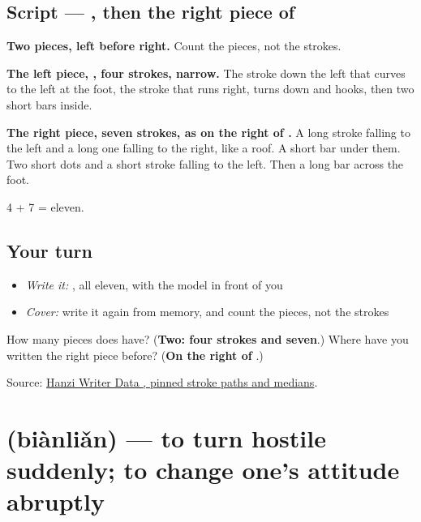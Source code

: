 \subsection*{Script — , then the right piece of }

\begin{quote}
\end{quote}

\textbf{Two pieces, left before right.} Count the pieces, not the strokes.

\textbf{The left piece, , four strokes, narrow.} The stroke down the left that curves to the left at the foot, the stroke that runs right, turns down and hooks, then two short bars inside.

\textbf{The right piece, seven strokes, as on the right of .} A long stroke falling to the left and a long one falling to the right, like a roof. A short bar under them. Two short dots and a short stroke falling to the left. Then a long bar across the foot.

4 + 7 = eleven.

\subsection*{Your turn}
\begin{itemize}
\raggedright
  \item \emph{Write it:} , all eleven, with the model in front of you
  \item \emph{Cover:} write it again from memory, and count the pieces, not the strokes
\end{itemize}

\begin{tcolorbox}[breakable,colback=teal!4,colframe=teal!35!black,title={Before you move on}]
How many pieces does  have? (\textbf{Two: four strokes and seven}.) Where have you written the right piece before? (\textbf{On the right of }.)

Source: \href{https://raw.githubusercontent.com/chanind/hanzi-writer-data/68d10a4b21150cae5e1ebbd223eed289cf32d90c/data/\%E8\%84\%B8.json}{Hanzi Writer Data , pinned stroke paths and medians}.
\end{tcolorbox}
\section[\texorpdfstring{\zh{变脸} (biànliǎn)}{变脸 (biànliǎn)}]{ (biànliǎn) — to turn hostile suddenly; to change one's attitude abruptly}

